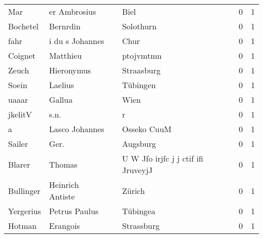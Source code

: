 \documentclass[10pt,a4paper,landscape]{article}
\begin{document}
\begin{longtable}{llllrr}
                      Mar &                       er Ambrosius &             &                                        Biel &          0 &         1 \\
                 Bochetel &                           Bernrdin &             &                                   Solothurn &          0 &         1 \\
                     fahr &                    i du s Johannes &             &                                        Chur &          0 &         1 \\
                  Coignet &                           Matthieu &             &                                   ptojvmtmn &          0 &         1 \\
                    Zeuch &                         Hieronymus &             &                                  Straasburg &          0 &         1 \\
                    Soein &                            Laelius &             &                                    Tübingen &          0 &         1 \\
                    uaaar &                             Gallua &             &                                        Wien &          0 &         1 \\
                  jkelitV &                               s.n. &             &                                           r &          0 &         1 \\
                        a &                     Lasco Johannes &             &                                 Osseko CuuM &          0 &         1 \\
                   Sailer &                               Ger. &             &                                    Augsburg &          0 &         1 \\
                   Blarer &                             Thomas &             &         U W Jfo irjfc j j ctif ifi JruveyjJ &          0 &         1 \\
                Bullinger &                   Heinrich Antiste &             &                                      Zürich &          0 &         1 \\
                Yergerius &                      Petrus Paulus &             &                                    Tübingea &          0 &         1 \\
                   Hotman &                           Erangois &             &                                  Strassburg &          0 &         1 \\

\end{longtable}
\end{document}
